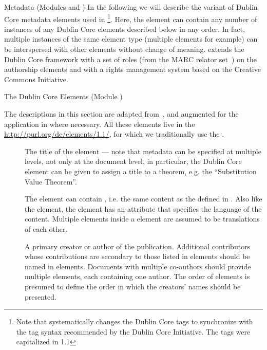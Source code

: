 \begin{tchapter}[id=metadata,short=Metadata]{Metadata (Modules {} and  {})}
In the following we will describe the variant of Dublin Core metadata elements used in
{\omdoc}\footnote{Note that {} systematically changes the Dublin Core {\xml}
  tags to synchronize with the tag syntax recommended by the Dublin Core Initiative. The
  tags were capitalized in {\omdoc}1.1}.  Here, the {} element can
contain any number of instances of any Dublin Core elements described below in any
order. In fact, multiple instances of the same element type (multiple
{} elements for example) can be interspersed with other
elements without change of meaning.  {\omdoc} extends the Dublin Core framework with a set
of roles (from the MARC relator set~\cite{Marc:relators03}) on the authorship elements and
with a rights management system based on the Creative Commons Initiative.

\begin{tsection}[id=dc-elements]{The Dublin Core Elements (Module {})}
  
  The descriptions in this section are adapted from~\cite{DCMI:dmt03}, and augmented for
  the application in {\omdoc} where necessary. All these elements live in the
  {} \url{http://purl.org/dc/elements/1.1/}, for which we
  traditionally use the {} {}.

\begin{description}
\item[{}] The title of the element --- note that {\omdoc}
  metadata can be specified at multiple levels, not only at the document level, in
  particular, the Dublin Core {} element can be given to assign a
  title to a theorem, e.g. the ``Substitution Value Theorem''.
  
  The {} element can contain
  {}, i.e. the same content as the {}
  defined in {}. Also like the {} element, the
  {} element has an
  {} attribute that specifies the language
  of the content. Multiple {} elements inside a
  {} element are assumed to be translations of each other.
\item[{}] A primary creator or author of the publication.
  Additional contributors whose contributions are secondary to those listed in
  {} elements should be named in
  {} elements.  Documents with multiple co-authors should
  provide multiple {} elements, each containing one author.
  The order of {} elements is presumed to define the order in
  which the creators' names should be presented.
  

\end{description}
\end{tsection}
\end{tchapter}
